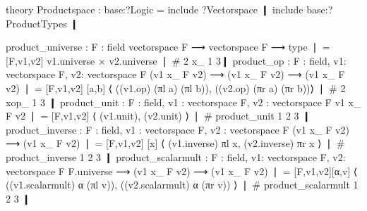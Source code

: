 \begin{mmtcode}[caption={Product Spaces using Sigma Types\protect\footnotemark},label=lst:lf:lfx:sigma:test]
theory Productspace : base:?Logic =
	include ?Vectorspace ❙
	include  base:?ProductTypes ❙
	
	product_universe : {F : field} vectorspace F ⟶ vectorspace F ⟶ type ❘
		= [F,v1,v2] v1.universe × v2.universe ❘ # 2 x_ 1 3❙
	product_op : {F : field, v1: vectorspace F, v2: vectorspace F} 
	  (v1 x_ F v2) ⟶ (v1 x_ F v2) ⟶ (v1 x_ F v2) ❘
		= [F,v1,v2] [a,b] ⟨ ((v1.op) (πl a) (πl b)), ((v2.op) (πr a) (πr b))⟩ ❘ # 2 xop_ 1 3 ❙
	product_unit : {F : field, v1 : vectorspace F, v2 : vectorspace F} v1 x_ F v2 ❘
		= [F,v1,v2] ⟨ (v1.unit), (v2.unit) ⟩ ❘ # product_unit 1 2 3 ❙
	product_inverse : {F : field, v1 : vectorspace F, v2 : vectorspace F}
	  (v1 x_ F v2) ⟶ (v1 x_ F v2) ❘
		= [F,v1,v2] [x] ⟨ (v1.inverse) πl x, (v2.inverse) πr x ⟩ ❘ # product_inverse 1 2 3 ❙
	product_scalarmult : {F : field, v1: vectorspace F, v2: vectorspace F} 
	  F.universe ⟶ (v1 x_ F v2) ⟶ (v1 x_ F v2) ❘
		= [F,v1,v2][α,v] ⟨ ((v1.scalarmult) α (πl v)), ((v2.scalarmult) α (πr v)) ⟩ ❘ 
		# product_scalarmult 1 2 3 ❙
\end{mmtcode}
